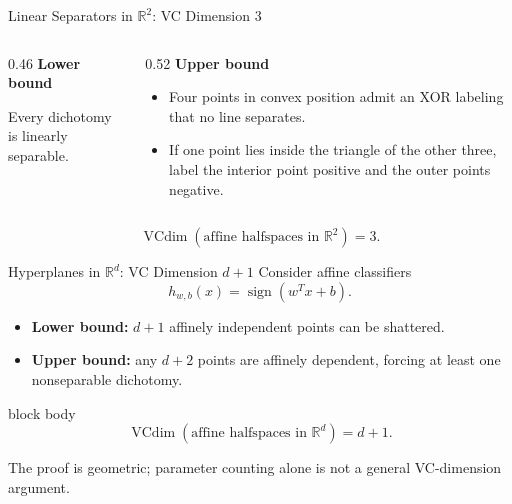 \documentclass[aspectratio=169,10pt]{beamer}
\DeclareMathOperator{\sign}{sign}
\newcommand{\vcdim}{\operatorname{VCdim}}
\begin{document}
\begin{frame}[t]{Linear Separators in $\mathbb{R}^2$: VC Dimension $3$}
  \vspace{0.01cm}
  \begin{columns}[T,totalwidth=\textwidth]
    \begin{column}{0.46\textwidth}
      \textbf{Lower bound}
      \begin{center}
      \end{center}
      Every dichotomy is linearly separable.
    \end{column}
    \begin{column}{0.52\textwidth}
      \textbf{Upper bound}
      \begin{itemize}
        \setlength{\itemsep}{0.10cm}
        \item Four points in convex position admit an XOR labeling that no line separates.
        \item If one point lies inside the triangle of the other three, label the interior point positive and the outer points negative.
      \end{itemize}
    \end{column}
  \end{columns}
  \vspace{0.04cm}
  \[
    \boxed{\vcdim(\text{affine halfspaces in }\mathbb{R}^2)=3.}
  \]
\end{frame}

\begin{frame}[t]{Hyperplanes in $\mathbb{R}^d$: VC Dimension $d+1$}
  \vspace{0.01cm}
  Consider affine classifiers
  \[
    h_{w,b}(x)=\sign(w^Tx+b).
  \]
  \begin{itemize}
    \setlength{\itemsep}{0.12cm}
    \item \textbf{Lower bound:} $d+1$ affinely independent points can be shattered.
    \item \textbf{Upper bound:} any $d+2$ points are affinely dependent, forcing at least one nonseparable dichotomy.
  \end{itemize}
  \vspace{0.05cm}
  \begin{beamercolorbox}[rounded=true,sep=0.18cm,wd=\linewidth]{block body}
    \[
      \boxed{\vcdim(\text{affine halfspaces in }\mathbb{R}^d)=d+1.}
    \]
  \end{beamercolorbox}
  \vspace{0.08cm}
  \centering
  The proof is geometric; parameter counting alone is not a general VC-dimension argument.
\end{frame}
\end{document}
